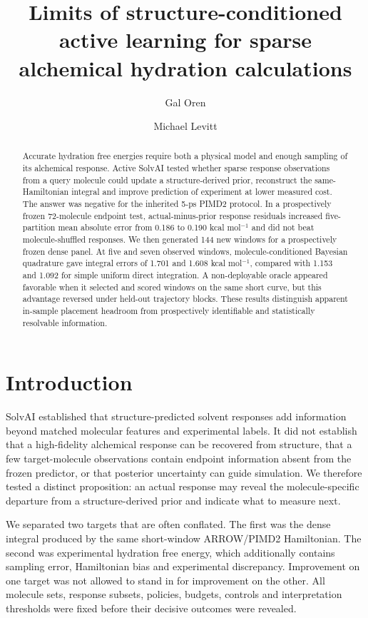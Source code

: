 \documentclass[11pt]{article}
\title{Limits of structure-conditioned active learning for sparse alchemical hydration calculations}
\author{Gal Oren \and Michael Levitt}
\date{}
\begin{document}
\maketitle

\begin{abstract}
Accurate hydration free energies require both a physical model and enough sampling of its alchemical response. Active SolvAI tested whether sparse response observations from a query molecule could update a structure-derived prior, reconstruct the same-Hamiltonian integral and improve prediction of experiment at lower measured cost. The answer was negative for the inherited 5-ps PIMD2 protocol. In a prospectively frozen 72-molecule endpoint test, actual-minus-prior response residuals increased five-partition mean absolute error from 0.186 to 0.190 kcal mol$^{-1}$ and did not beat molecule-shuffled responses. We then generated 144 new windows for a prospectively frozen dense panel. At five and seven observed windows, molecule-conditioned Bayesian quadrature gave integral errors of 1.701 and 1.608 kcal mol$^{-1}$, compared with 1.153 and 1.092 for simple uniform direct integration. A non-deployable oracle appeared favorable when it selected and scored windows on the same short curve, but this advantage reversed under held-out trajectory blocks. These results distinguish apparent in-sample placement headroom from prospectively identifiable and statistically resolvable information.
\end{abstract}

\section{Introduction}
SolvAI established that structure-predicted solvent responses add information beyond matched molecular features and experimental labels. It did not establish that a high-fidelity alchemical response can be recovered from structure, that a few target-molecule observations contain endpoint information absent from the frozen predictor, or that posterior uncertainty can guide simulation. We therefore tested a distinct proposition: an actual response may reveal the molecule-specific departure from a structure-derived prior and indicate what to measure next.

We separated two targets that are often conflated. The first was the dense integral produced by the same short-window ARROW/PIMD2 Hamiltonian. The second was experimental hydration free energy, which additionally contains sampling error, Hamiltonian bias and experimental discrepancy. Improvement on one target was not allowed to stand in for improvement on the other. All molecule sets, response subsets, policies, budgets, controls and interpretation thresholds were fixed before their decisive outcomes were revealed.
\end{document}
